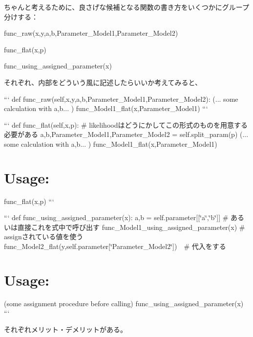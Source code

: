 ちゃんと考えるために、良さげな候補となる関数の書き方をいくつかにグループ分けする：


\begin{DoxyEnumerate}
\item func\+\_\+raw(x,y,a,b,\+Parameter\+\_\+\+Model1,\+Parameter\+\_\+\+Model2)
\end{DoxyEnumerate}
\begin{DoxyEnumerate}
\item func\+\_\+flat(x,p)
\end{DoxyEnumerate}
\begin{DoxyEnumerate}
\item func\+\_\+using\+\_\+assigned\+\_\+parameter(x)
\end{DoxyEnumerate}

それぞれ、内部をどういう風に記述したらいいか考えてみると、

``` def func\+\_\+raw(self,x,y,a,b,\+Parameter\+\_\+\+Model1,\+Parameter\+\_\+\+Model2)\+: (... some calculation with a,b... ) func\+\_\+\+Model1\+\_\+flat(x,\+Parameter\+\_\+\+Model1) ```

``` def func\+\_\+flat(self,x,p)\+: \# likelihoodはどうにかしてこの形式のものを用意する必要がある a,b,Parameter\+\_\+\+Model1,Parameter\+\_\+\+Model2 = self.\+split\+\_\+param(p) (... some calculation with a,b... ) func\+\_\+\+Model1\+\_\+flat(x,\+Parameter\+\_\+\+Model1)

\section*{Usage\+:}

func\+\_\+flat(x,p) ```

``` def func\+\_\+using\+\_\+assigned\+\_\+parameter(x)\+: a,b = self.\+parameter\mbox{[}\mbox{[}\char`\"{}a\char`\"{},\char`\"{}b\char`\"{}\mbox{]}\mbox{]} \# あるいは直接これを式中で呼び出す func\+\_\+\+Model1\+\_\+using\+\_\+assigned\+\_\+parameter(x) \# assignされている値を使う func\+\_\+\+Model2\+\_\+flat(y,self.\+parameter\mbox{[}\char`\"{}\+Parameter\+\_\+\+Model2\char`\"{}\mbox{]})　\# 代入をする

\section*{Usage\+:}

(some assignment procedure before calling) func\+\_\+using\+\_\+assigned\+\_\+parameter(x) ```

それぞれメリット・デメリットがある。


